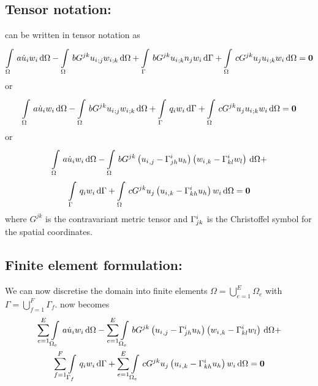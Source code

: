 \subsection{Tensor notation:}

 can be written in tensor notation as
\begin{equation}
  \gint{\Omega}{}{a\dot{u}_{i}w_{i}}{\Omega}-
  \gint{\Omega}{}{bG^{jk}\covarderiv{u_{i}}{j}\covarderiv{w_{i}}{k}}{\Omega}+
  \gint{\Gamma}{}{bG^{jk}\covarderiv{u_{i}}{k}n_{j}w_{i}}{\Gamma} +
  \gint{\Omega}{}{cG^{jk}u_{j}\covarderiv{u_{i}}{k}w_{i}}{\Omega}=\vectr{0}
  \label{eqn:Burgerstensorform1}
\end{equation}
or
\begin{equation}
  \gint{\Omega}{}{a\dot{u}_{i}w_{i}}{\Omega}-
  \gint{\Omega}{}{bG^{jk}\covarderiv{u_{i}}{j}\covarderiv{w_{i}}{k}}{\Omega}+
  \gint{\Gamma}{}{q_{i}w_{i}}{\Gamma} +
  \gint{\Omega}{}{cG^{jk}u_{j}\covarderiv{u_{i}}{k}w_{i}}{\Omega}=\vectr{0}
  \label{eqn:Burgerstensorform2}
\end{equation}
or
\begin{multline}
  \gint{\Omega}{}{a\dot{u}_{i}w_{i}}{\Omega}-
  \gint{\Omega}{}{bG^{jk}\pbrac{\partialderiv{u_{i}}{j}-\christoffel{i}{j}{h}u_{h}}
    \pbrac{\partialderiv{w_{i}}{k}-\christoffel{i}{k}{l}w_{l}}}{\Omega}+ \\
  \gint{\Gamma}{}{q_{i}w_{i}}{\Gamma} +
  \gint{\Omega}{}{cG^{jk}u_{j}\pbrac{\partialderiv{u_{i}}{k}-
      \christoffel{i}{k}{h}u_{h}}w_{i}}{\Omega}=\vectr{0}
  \label{eqn:Burgerstensorform3}
\end{multline}
where $G^{jk}$ is the contravariant metric tensor and $ \Gamma^{i}_{jk} $
is the Christoffel symbol for the spatial coordinates.

\subsection{Finite element formulation:}

We can now discretise the domain into finite elements \ie $\Omega=
\displaystyle{\bigcup_{e=1}^{E}}\Omega_{e}$ with
$\Gamma=\displaystyle{\bigcup_{f=1}^{F}}\Gamma_{f}$. 
now becomes
\begin{multline}
  \dsum_{e=1}^{E}\gint{\Omega_{e}}{}{a\dot{u}_{i}w_{i}}{\Omega}-
  \dsum_{e=1}^{E}\gint{\Omega_{e}}{}{bG^{jk}\pbrac{\partialderiv{u_{i}}{j}-
      \christoffel{i}{j}{h}u_{h}} \pbrac{\partialderiv{w_{i}}{k}-
      \christoffel{i}{k}{l}w_{l}}}{\Omega}+ \\
  \dsum_{f=1}^{F}\gint{\Gamma_{f}}{}{q_{i}w_{i}}{\Gamma} +
  \dsum_{e=1}^{E}\gint{\Omega_{e}}{}{cG^{jk}u_{j}\pbrac{\partialderiv{u_{i}}{k}-
      \christoffel{i}{k}{h}u_{h}}w_{i}}{\Omega}=\vectr{0}
  \label{eqn:Burgersfemform1}
\end{multline}

